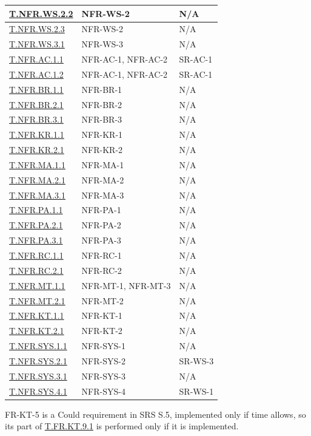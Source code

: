 \documentclass[12pt, titlepage]{article}
\newcommand{\testrow}[1]{\leavevmode\hypertarget{trace:#1}{}\hyperlink{test:#1}{#1}}
\newcommand{\testref}[1]{\hyperlink{test:#1}{#1}}
\begin{document}
\begin{xltabular}{\textwidth}{|l|X|X|}
\testrow{T.NFR.WS.2.2} & NFR-WS-2 & N/A \\ \hline
\testrow{T.NFR.WS.2.3} & NFR-WS-2 & N/A \\ \hline
\testrow{T.NFR.WS.3.1} & NFR-WS-3 & N/A \\ \hline
\testrow{T.NFR.AC.1.1} & NFR-AC-1, NFR-AC-2 & SR-AC-1 \\ \hline
\testrow{T.NFR.AC.1.2} & NFR-AC-1, NFR-AC-2 & SR-AC-1 \\ \hline
\testrow{T.NFR.BR.1.1} & NFR-BR-1 & N/A \\ \hline
\testrow{T.NFR.BR.2.1} & NFR-BR-2 & N/A \\ \hline
\testrow{T.NFR.BR.3.1} & NFR-BR-3 & N/A \\ \hline
\testrow{T.NFR.KR.1.1} & NFR-KR-1 & N/A \\ \hline
\testrow{T.NFR.KR.2.1} & NFR-KR-2 & N/A \\ \hline
\testrow{T.NFR.MA.1.1} & NFR-MA-1 & N/A \\ \hline
\testrow{T.NFR.MA.2.1} & NFR-MA-2 & N/A \\ \hline
\testrow{T.NFR.MA.3.1} & NFR-MA-3 & N/A \\ \hline
\testrow{T.NFR.PA.1.1} & NFR-PA-1 & N/A \\ \hline
\testrow{T.NFR.PA.2.1} & NFR-PA-2 & N/A \\ \hline
\testrow{T.NFR.PA.3.1} & NFR-PA-3 & N/A \\ \hline
\testrow{T.NFR.RC.1.1} & NFR-RC-1 & N/A \\ \hline
\testrow{T.NFR.RC.2.1} & NFR-RC-2 & N/A \\ \hline
\testrow{T.NFR.MT.1.1} & NFR-MT-1, NFR-MT-3 & N/A \\ \hline
\testrow{T.NFR.MT.2.1} & NFR-MT-2 & N/A \\ \hline
\testrow{T.NFR.KT.1.1} & NFR-KT-1 & N/A \\ \hline
\testrow{T.NFR.KT.2.1} & NFR-KT-2 & N/A \\ \hline
\testrow{T.NFR.SYS.1.1} & NFR-SYS-1 & N/A \\ \hline
\testrow{T.NFR.SYS.2.1} & NFR-SYS-2 & SR-WS-3 \\ \hline
\testrow{T.NFR.SYS.3.1} & NFR-SYS-3 & N/A \\ \hline
\testrow{T.NFR.SYS.4.1} & NFR-SYS-4 & SR-WS-1 \\ \hline
\end{xltabular}

FR-KT-5 is a Could requirement in SRS S.5, implemented only if time allows, so
its part of \testref{T.FR.KT.9.1} is performed only if it is implemented.
\end{document}
